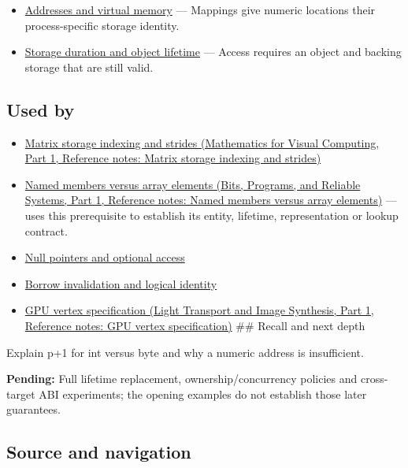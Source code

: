 \begin{itemize}
\tightlist
\item
  \hyperref[appendix-18ee4f913c3c]{Addresses and virtual memory} --- Mappings give numeric locations their process-specific storage identity.
\item
  \hyperref[appendix-0b104bcba06b]{Storage duration and object lifetime} --- Access requires an object and backing storage that are still valid.
\end{itemize}

\subsection{Used by}\label{appendix-6af5921bc853-used-by}

\hypertarget{appendix-6af5921bc853-used-by}{}

\begin{itemize}
\item
  \href{../02-Mathematics-for-Visual-Computing-P01/main.pdf\#nameddest=appendix-ffdc1d4e5350}{Matrix storage indexing and strides (Mathematics for Visual Computing, Part 1, Reference notes: Matrix storage indexing and strides)}
\item
  \href{../01-Bits-Programs-and-Reliable-Systems-P01/main.pdf\#nameddest=appendix-3f7e15effba6}{Named members versus array elements (Bits, Programs, and Reliable Systems, Part 1, Reference notes: Named members versus array elements)} --- uses this prerequisite to establish its entity, lifetime, representation or lookup contract.
\item
  \hyperref[appendix-afae48c31800]{Null pointers and optional access}
\item
  \hyperref[appendix-f9b8b9188c7f]{Borrow invalidation and logical identity}
\item
  \href{../04-Light-Transport-and-Image-Synthesis-P01/main.pdf\#nameddest=appendix-749ba51a6c25}{GPU vertex specification (Light Transport and Image Synthesis, Part 1, Reference notes: GPU vertex specification)} \#\# Recall and next depth
\end{itemize}

Explain p+1 for int versus byte and why a numeric address is insufficient.

\textbf{Pending:} Full lifetime replacement, ownership/concurrency policies and cross-target ABI experiments; the opening examples do not establish those later guarantees.

\subsection{Source and navigation}\label{appendix-6af5921bc853-source-and-navigation}

